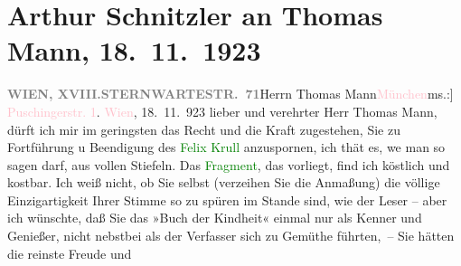 

               \section[Arthur Schnitzler an Thomas Mann, 18. 11. 1923]{ Arthur Schnitzler an Thomas Mann, 18. 11. 1923}\nopagebreak{}\rehead{ }\normalsize\beginnumbering{} \toendnotes[C]{\smallbreak\pagebreak[2]} 
\toendnotes[C]{\smallbreak}\pstart{}{\pb}\label{T_L02404-1v}\label{T_L02404-1h}\pend{}\pstart{}\textcolor{pink}{\textcolor{gray}{\textbf{WIEN, XVIII.}}}{}\ledrightnote{\textcolor{pink}{XVIII., Währing}}\pend{}\pstart{}\textcolor{pink}{\textcolor{gray}{\textbf{STERNWARTESTR. 71}}}{}\ledrightnote{\textcolor{pink}{Sternwartestraße}}\pend{}{\bigskip}\pstart{}{\pb}Herrn Thomas Mann\pend{}\pstart{}\textcolor{pink}{München}{}\ledrightnote{\textcolor{pink}{München}}\pend{}\pstart{}\strikeout{Puch}{ }{[}ms.:{]} \textcolor{pink}{Puschingerstr. 1}{}\ledrightnote{\textcolor{pink}{Poschingerstraße}}. \pend{}{\bigskip}\pstart
           \raggedleft{}{\pb}\textcolor{pink}{Wien}{}\ledrightnote{\textcolor{pink}{Wien}}, 18. 11. 923\pend
           \pstart{}lieber und verehrter Herr Thomas Mann,\pend\pstart
           dürft ich mir im geringsten das Recht und die Kraft zugestehen, Sie zu
                    Fortführung u Beendigung des \textcolor{green}{Felix Krull}{}\ledrightnote{\textcolor{green}{Bekenntnisse des Hochstaplers Felix Krull}}
                    anzuspornen, ich thät es, we{\geminationn} man so sagen darf,
                    aus vollen Stiefeln. Das \textcolor{green}{Fragment}{}, das vorliegt, find ich köstlich und kostbar. Ich weiß nicht,
                    ob Sie selbst (verzeihen Sie die Anmaßung) die völlige Einzigartigkeit Ihrer
                    Stimme so zu spüren im Stande sind, wie der Leser – aber ich wünschte, daß Sie
                    das »Buch der Kindheit« einmal nur als Kenner und Genießer, nicht nebstbei als
                    der Verfasser sich zu Gemüthe führten, – Sie hätten die reinste Freude und
